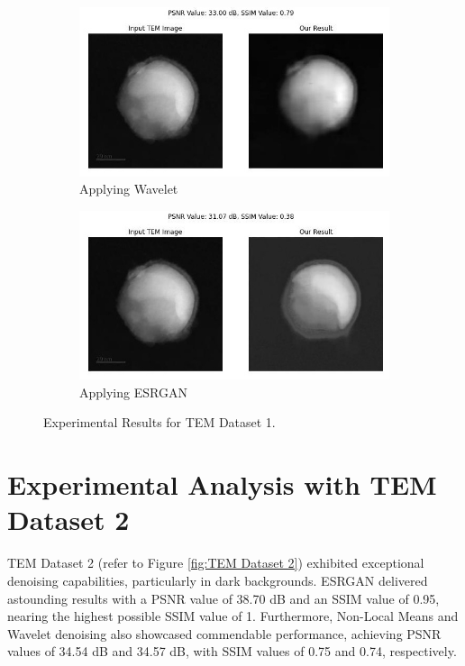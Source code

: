\begin{figure}[H]
    \begin{subfigure}{.47\textwidth} %
        \includegraphics[width=\textwidth]{img/Results/Dataset_1/Dataset_1_wavelet.jpg}
        \caption{Applying Wavelet}
        \label{fig:Image5}
    \end{subfigure}
    \hfill
    \begin{subfigure}{.47\textwidth} %
        \includegraphics[width=\textwidth]{img/Results/Dataset_1/Dataset_1_ESRGAN.jpg}
        \caption{Applying ESRGAN}
        \label{fig:Image5}
    \end{subfigure}
    \caption{Experimental Results for TEM Dataset 1.}
    \label{fig:TEM_Dataset_1_Results}
\end{figure}


\clearpage
\section{Experimental Analysis with TEM Dataset 2}
TEM Dataset 2 (refer to Figure \ref{fig:TEM Dataset 2}) exhibited exceptional denoising capabilities, particularly in dark backgrounds. ESRGAN delivered astounding results with a PSNR value of 38.70 dB and an SSIM value of 0.95, nearing the highest possible SSIM value of 1. Furthermore, Non-Local Means and Wavelet denoising also showcased commendable performance, achieving PSNR values of 34.54 dB and 34.57 dB, with SSIM values of 0.75 and 0.74, respectively.
\vspace{10pt}

